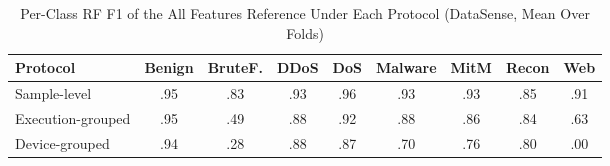 \begin{table}[t]
\revon
\caption{Per-Class RF F1 of the All Features Reference Under Each Protocol (DataSense, Mean Over Folds)}
\label{tab:perclass}
\centering
\footnotesize
\setlength{\tabcolsep}{2.5pt}
\begin{tabular}{@{}lcccccccc@{}}
\toprule
Protocol & Benign & BruteF. & DDoS & DoS & Malware & MitM & Recon & Web \\
\midrule
Sample-level & .95 & .83 & .93 & .96 & .93 & .93 & .85 & .91 \\
Execution-grouped & .95 & .49 & .88 & .92 & .88 & .86 & .84 & .63 \\
Device-grouped & .94 & .28 & .88 & .87 & .70 & .76 & .80 & .00 \\
\bottomrule
\end{tabular}
\end{table}
